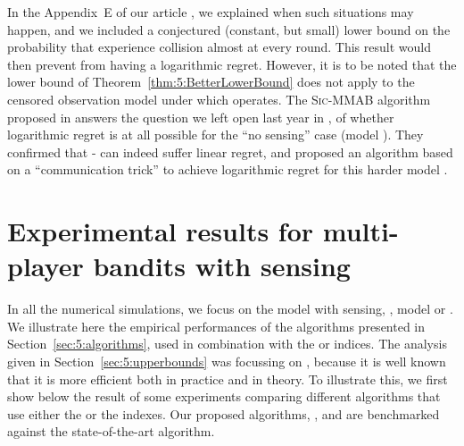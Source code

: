 In the Appendix~E of our article \cite{Besson2018ALT},
we explained when such situations may happen, and we included a conjectured (constant, but small) lower bound on the probability that \Selfish{} experience collision almost at every round. This result would then prevent \Selfish{} from having a logarithmic regret. However, it is to be noted that the lower bound of Theorem~\ref{thm:5:BetterLowerBound} does not apply to the censored observation model \modeltrois{} under which \Selfish{} operates.
%
The \textsc{Sic-MMAB} algorithm proposed in \cite{BoursierPerchet18} answers the question we left open last year in \cite{Besson2018ALT},
of whether logarithmic regret is at all possible for the ``no sensing'' case (model \modeltrois).
They confirmed that \Selfish-\UCB{} can indeed suffer linear regret, and proposed an algorithm based on a ``communication trick'' to achieve logarithmic regret for this harder model \modeltrois.



\section{Experimental results for multi-player bandits with sensing}
\label{sec:5:experiments}





In all the numerical simulations, we focus on the model with sensing, \ie, model \modelun{} or \modeldeux.
%
We illustrate here the empirical performances of the algorithms presented in Section~\ref{sec:5:algorithms}, used in combination with the \UCB{} or \klUCB{} indices.
The analysis given in Section~\ref{sec:5:upperbounds} was focussing on \klUCB, because it is well known that it is more efficient both in practice and in theory.
To illustrate this, we first show below the result of some experiments comparing different algorithms that use either the \UCB{} or the \klUCB{} indexes.
%
Our proposed algorithms, \MCTopM{}, \RandTopM{} and \Selfish{} are benchmarked against the state-of-the-art \RhoRand{} algorithm.

